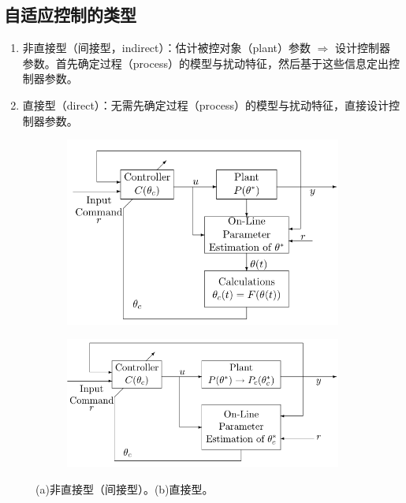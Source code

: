\subsection{自适应控制的类型}
\begin{enumerate}
      \item 非直接型（间接型，indirect）：估计被控对象（plant）参数 $\Rightarrow$ 设计控制器参数。首先确定过程（process）的模型与扰动特征，然后基于这些信息定出控制器参数。
      
      \item 直接型（direct）：无需先确定过程（process）的模型与扰动特征，直接设计控制器参数。
\end{enumerate}
\begin{figure}[htbp]
  \centering
  \begin{subfigure}{0.45\textwidth}
    \includegraphics[width=1\linewidth]{figure/adaptive/indirect.png} %
    \caption{}
\end{subfigure}
  \begin{subfigure}{0.45\textwidth}
    \includegraphics[width=1\linewidth]{figure/adaptive/direct.png} %
    \caption{}
\end{subfigure}
\caption{(a)非直接型（间接型）。(b)直接型。}
\label{direct_indirect}
\end{figure}
